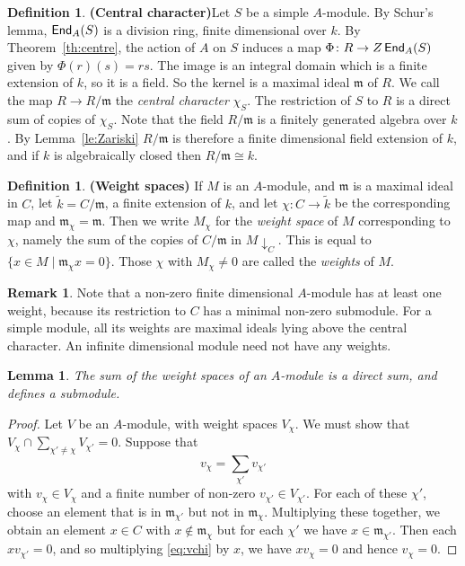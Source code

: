 \documentclass[12pt]{amsart}
\newcommand{\da}{\downarrow}
\newcommand{\End}{\operatorname{\sf End}}
\newcommand{\mfm}{\mathfrak{m}}
\numberwithin{equation}{section}
\newtheorem{lemma}[equation]{Lemma}
\theoremstyle{definition}
\newtheorem{remark}[equation]{Remark}
\newtheorem{definition}[equation]{Definition}
\begin{document}
\begin{definition} {\bf (Central character)}\label{def:central-character}
Let $S$ be a simple $A$-module. 
By Schur's lemma, $\End_A(S)$ is a 
division ring, finite dimensional over $k$. By Theorem~\ref{th:centre},
the action of $A$ on $S$ induces a map $\Phi\colon R\to
Z\End_A(S)$ given by $\Phi(r)(s)=rs$.  The image is an integral domain which is a finite
extension of $k$, so it is a field. So the kernel is a maximal ideal $\mfm$
of $R$. We call the map $R\to R/\mfm$
the \emph{central character}  $\chi_S$. The restriction of $S$ to
$R$ is a direct sum of copies of $\chi_S$. Note that the
field $R/\mfm$ is a finitely generated algebra over $k$. By
Lemma~\ref{le:Zariski} $R/\mfm$ is therefore a finite dimensional field
extension of $k$, and if $k$
is algebraically closed then $R/\mfm\cong k$.
\end{definition}


\begin{definition}{\bf (Weight spaces)}
If $M$ is an $A$-module, and $\mfm$ is a maximal
ideal in $C$, let $\tilde k=C/\mfm$, a finite extension of $k$, 
and let $\chi\colon C \to \tilde k$ be the corresponding map and $\mfm_\chi=\mfm$.
Then we write $M_\chi$ for the \emph{weight space} of $M$
corresponding to $\chi$, namely
the sum of the copies of $C/\mfm$ in $M{\da_C}$. This is equal to
$\{x\in M\mid \mfm_\chi x = 0\}$. 
Those $\chi$ with $M_\chi\ne 0$ are called the \emph{weights} of
$M$.   
\end{definition}

\begin{remark}
Note that a non-zero finite dimensional $A$-module has at least one
weight, because its restriction to $C$ has a minimal non-zero
submodule. For a simple module, all its weights are maximal ideals
lying above the central character. An infinite dimensional module need
not have any weights.
\end{remark}


\begin{lemma}\label{le:direct-sum}
The sum of the weight spaces of an $A$-module is a direct sum, and
defines a submodule.
\end{lemma}
\begin{proof}
Let $V$ be an $A$-module, with weight spaces $V_\chi$.
We must show that $V_\chi\cap \sum_{\chi'\ne\chi}V_{\chi'}=0$. Suppose
that 
\begin{equation}\label{eq:vchi}
v_\chi=\sum_{\chi'}v_{\chi'}
\end{equation} 
with $v_\chi\in
V_\chi$ and a finite number of non-zero $v_{\chi'} \in V_{\chi'}$. For
each of these $\chi'$, choose an element that
is in $\mfm_{\chi'}$ but not in $\mfm_\chi$. Multiplying these
together, we obtain an element $x\in C$ with $x\not\in\mfm_\chi$ but
for each $\chi'$ we have $x\in\mfm_{\chi'}$. Then each $xv_{\chi'}=0$,
and so multiplying \eqref{eq:vchi} by $x$, we have $xv_\chi=0$ and
hence $v_\chi=0$.
\end{proof}
\end{document}
